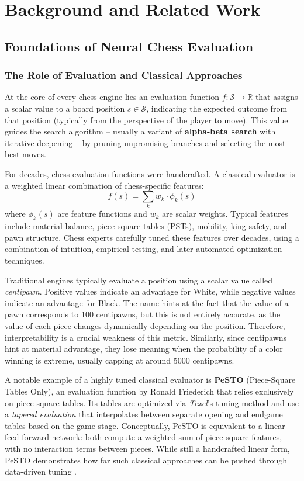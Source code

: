 \chapter{Background and Related Work}

\section{Foundations of Neural Chess Evaluation}

\subsection{The Role of Evaluation and Classical Approaches}
At the core of every chess engine lies an evaluation function $f: \mathcal{S} \rightarrow \mathbb{R}$ that assigns a scalar value to a board position $s \in \mathcal{S}$, indicating the expected outcome from that position (typically from the perspective of the player to move). This value guides the search algorithm -- usually a variant of \textbf{alpha-beta search} with iterative deepening -- by pruning unpromising branches and selecting the most best moves.

For decades, chess evaluation functions were handcrafted. A classical evaluator is a weighted linear combination of chess-specific features:
\[
f(s) = \sum_{k} w_k \cdot \phi_k(s)
\]
where $\phi_k(s)$ are feature functions and $w_k$ are scalar weights. Typical features include material balance, piece-square tables (PSTs), mobility, king safety, and pawn structure. Chess experts carefully tuned these features over decades, using a combination of intuition, empirical testing, and later automated optimization techniques.

Traditional engines typically evaluate a position using a scalar value called \emph{centipawn}. Positive values indicate an advantage for White, while negative values indicate an advantage for Black. The name hints at the fact that the value of a pawn corresponds to 100 centipawns, but this is not entirely accurate, as the value of each piece changes dynamically depending on the position. Therefore, interpretability is a crucial weakness of this metric. Similarly, since centipawns hint at material advantage, they lose meaning when the probability of a color winning is extreme, usually capping at around 5000 centipawns.


A notable example of a highly tuned classical evaluator is \textbf{PeSTO} (Piece-Square Tables Only), an evaluation function by Ronald Friederich that relies exclusively on piece-square tables. Its tables are optimized via \emph{Texel}'s tuning method and use a \emph{tapered evaluation} that interpolates between separate opening and endgame tables based on the game stage. Conceptually, PeSTO is equivalent to a linear feed-forward network: both compute a weighted sum of piece-square features, with no interaction terms between pieces. While still a handcrafted linear form, PeSTO demonstrates how far such classical approaches can be pushed through data-driven tuning \parencite{friederichpesto}.

